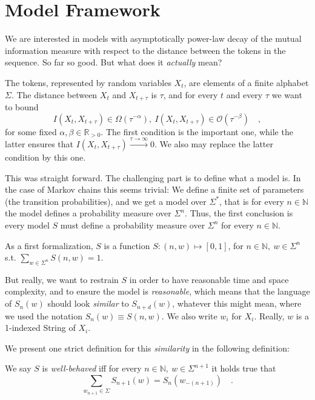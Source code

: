 \documentclass[../../main.tex]{subfiles}
\begin{document}
\section{Model Framework}
    We are interested in models with asymptotically power-law decay of the mutual information measure with respect to the distance between the tokens in the sequence. So far so good. But what does it \emph{actually} mean?

    The tokens, represented by random variables $X_t$, are elements of a finite alphabet $\Sigma$. The distance between $X_t$ and $X_{t + \tau}$ is $\tau$, and for every $t$ and every $\tau$ we want to bound
    \[
        I(X_t, X_{t + \tau}) \in \Omega(\tau^{-\alpha}), \ I(X_t, X_{t + \tau}) \in \mathcal{O}(\tau^{-\beta}) \quad ,
    \]
    for some fixed $\alpha, \beta \in \mathbb{R}_{>0}$. The first condition is the important one, while the latter ensures that $I(X_t, X_{t + \tau}) \xrightarrow{\tau \to \infty} 0$. We also may replace the latter condition by this one.

    This was straight forward. The challenging part is to define what a  model is. In the case of Markov chains this seems trivial: We define a finite set of parameters (the transition probabilities), and we get a model over $\Sigma^*$, that is for every $n \in \mathbb{N}$ the model defines a probability measure over $\Sigma^n$. Thus, the first conclusion is every model $S$ must define a probability measure over $\Sigma^n$ for every $n\in \mathbb{N}$.

    As a first formalization, $S$ is a function $S: (n, w) \mapsto [0, 1]$, for $n \in \mathbb{N}, \ w \in \Sigma^n$ s.t. $\sum_{w \in \Sigma^n} S(n, w) = 1$.

    But really, we want to restrain $S$ in order to have reasonable time and space complexity, and to ensure the model is \emph{reasonable}, which means that the language of $S_n(w)$ should look \emph{similar} to $S_{n + d}(w)$, whatever this might mean, where we used the notation $S_n(w) \equiv S(n, w)$. We also write $w_i$ for $X_i$. Really, $w$ is a 1-indexed String of $X_i$.  

    We present one strict definition for this \emph{similarity} in the following definition:

    \begin{definition}
        We say $S$ is \emph{well-behaved} iff for every $n \in \mathbb{N}, \ w \in \Sigma^{n + 1}$ it holds true that
        \[
            \sum_{w_{n + 1} \in \Sigma} S_{n + 1}(w) = S_n(w_{-(n + 1)}) \quad .
        \]
    \end{definition}
\end{document}
